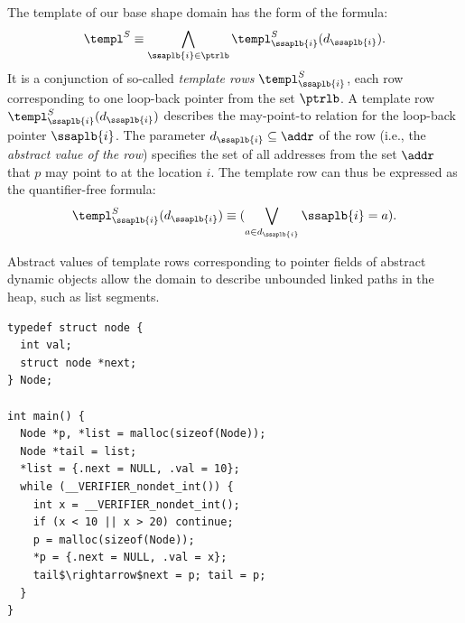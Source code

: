 {The template of our base shape domain has the form of the formula:
\begin{equation}\label{eq:templ_shape}
\begin{split}
\templ^S \equiv \bigwedge_{\ssaplb{i} \in \ptrlb}
\templ^S_{\ssaplb{i}}(d_{\ssaplb{i}}).
\end{split}
\end{equation}
%
It is a conjunction of so-called \emph{template rows} $\templ^S_{\ssaplb{i}}$,
each row corresponding to one loop-back pointer from the set $\ptrlb$.
%
A template row $\templ^S_{\ssaplb{i}}(d_{\ssaplb{i}})$ describes the
may-point-to relation for the loop-back pointer $\ssaplb{i}$.
%
The parameter $d_{\ssaplb{i}} \subseteq \addr$ of the row (i.e., the
\emph{abstract value of the row}) specifies the set of all addresses from the
set $\addr$ that $p$ may point to at the location $i$.
%
The template row can thus be expressed as the quantifier-free formula:
\begin{equation}\label{eq:templ_row}
\begin{split}
\templ^S_{\ssaplb{i}}(d_{\ssaplb{i}}) \equiv (\bigvee_{a \in
d_{\ssaplb{i}}} \ssaplb{i} = a).
\end{split}
\end{equation}
  
Abstract values of template rows corresponding to pointer fields of abstract
dynamic objects allow the domain to describe unbounded linked paths in the heap,
such as list segments.

\begin{lstlisting}[caption={A running example}, label={lst:example},
                   mathescape=true, basicstyle=\footnotesize\ttfamily,
                   float=tp,floatplacement=tbp,abovecaptionskip=0mm,
                   belowskip=-4mm,  xleftmargin=.33\textwidth, xrightmargin=.1\textwidth]
typedef struct node {
  int val;
  struct node *next;
} Node;

int main() {
  Node *p, *list = malloc(sizeof(Node));
  Node *tail = list;
  *list = {.next = NULL, .val = 10};
  while (__VERIFIER_nondet_int()) {
    int x = __VERIFIER_nondet_int();
    if (x < 10 || x > 20) continue;
    p = malloc(sizeof(Node));
    *p = {.next = NULL, .val = x};
    tail$\rightarrow$next = p; tail = p;
  }
}
\end{lstlisting}

}
